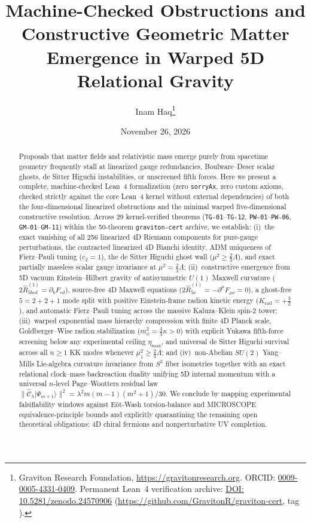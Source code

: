 \documentclass[11pt,a4paper]{article}
\title{\textbf{Machine-Checked Obstructions and Constructive Geometric Matter Emergence in Warped 5D Relational Gravity}}
\author{
  Inam Haq\thanks{Graviton Research Foundation, \url{https://gravitonresearch.org}. ORCID: \href{https://orcid.org/0009-0005-4331-0409}{0009-0005-4331-0409}. Permanent Lean~4 verification archive: \href{https://doi.org/10.5281/zenodo.24570906}{DOI: 10.5281/zenodo.24570906} (\url{https://github.com/GravitonR/graviton-cert}, tag \code{v0.4.1}).}
}
\date{November 26, 2026}
\theoremstyle{plain}
\theoremstyle{remark}
\newcommand{\dd}{\partial}
\newcommand{\Rhat}{\widehat{R}}
\newcommand{\Ccal}{\widehat{\mathcal{C}}}
\newcommand{\code}[1]{\texttt{\small #1}}
\begin{document}
\maketitle

\begin{abstract}
Proposals that matter fields and relativistic mass emerge purely from spacetime geometry frequently stall at linearized gauge redundancies, Boulware--Deser scalar ghosts, de Sitter Higuchi instabilities, or unscreened fifth forces. Here we present a complete, machine-checked Lean~4 formalization (zero \code{sorryAx}, zero custom axioms, checked strictly against the core Lean~4 kernel without external dependencies) of both the four-dimensional linearized obstructions and the minimal warped five-dimensional constructive resolution. Across 29 kernel-verified theorems (\code{TG-01}--\code{TG-12}, \code{PW-01}--\code{PW-06}, \code{GM-01}--\code{GM-11}) within the 50-theorem \code{graviton-cert} archive, we establish: (i)~the exact vanishing of all 256 linearized 4D Riemann components for pure-gauge perturbations, the contracted linearized 4D Bianchi identity, ADM uniqueness of Fierz--Pauli tuning ($c_2=1$), the de Sitter Higuchi ghost wall ($\mu^2 \ge \frac{2}{3}\Lambda$), and exact partially massless scalar gauge invariance at $\mu^2 = \frac{2}{3}\Lambda$; (ii)~constructive emergence from 5D vacuum Einstein--Hilbert gravity of antisymmetric $U(1)$ Maxwell curvature ($2\Rhat^{(1)}_{5bcd} = \dd_b F_{cd}$), source-free 4D Maxwell equations ($2\Rhat^{(1)}_{5\nu} = -\dd^\mu F_{\mu\nu} = 0$), a ghost-free $5 = 2+2+1$ mode split with positive Einstein-frame radion kinetic energy ($K_{\mathrm{rad}} = +\tfrac{3}{2}$), and automatic Fierz--Pauli tuning across the massive Kaluza--Klein spin-2 tower; (iii)~warped exponential mass hierarchy compression with finite 4D Planck scale, Goldberger--Wise radion stabilization ($m_\phi^2 = \frac{4}{3}\kappa > 0$) with explicit Yukawa fifth-force screening below any experimental ceiling $\eta_{\max}$, and universal de Sitter Higuchi survival across all $n \ge 1$ KK modes whenever $\mu_1^2 \ge \frac{2}{3}\Lambda$; and (iv)~non-Abelian $SU(2)$ Yang--Mills Lie-algebra curvature invariance from $S^3$ fiber isometries together with an exact relational clock--mass backreaction duality unifying 5D internal momentum with a universal $n$-level Page--Wootters residual law $\|\Ccal_\lambda |\Psi_{m+1}\rangle\|^2 = \lambda^2 m(m-1)(m^2+1)/30$. We conclude by mapping experimental falsifiability windows against E\"ot-Wash torsion-balance and MICROSCOPE equivalence-principle bounds and explicitly quarantining the remaining open theoretical obligations: 4D chiral fermions and nonperturbative UV completion.
\end{abstract}
\end{document}
